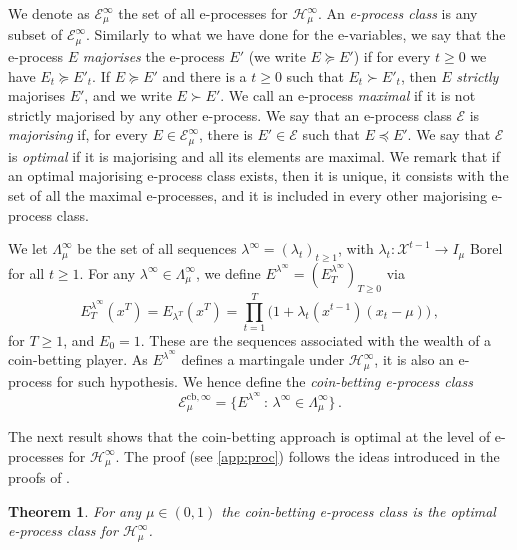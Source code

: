 \documentclass[3p, authoryear, 10pt]{elsarticle}%
\newcommand{\Ecbinf}{\mathcal E^{\mathrm{cb},\infty}}
\newcommand{\Ee}{\mathcal E}
\newcommand{\Hh}{\mathcal H}
\newcommand{\X}{\mathcal X}
\newtheorem{theorem}{Theorem}
\begin{document}
We denote as $\Ee_\mu^{\infty}$ the set of all e-processes for $\Hh_\mu^\infty$. An \emph{e-process class} is any subset of $\Ee_\mu^{\infty}$. Similarly to what we have done for the e-variables, we say that the e-process $E$ \emph{majorises} the e-process $E'$ (we write $E\succeq E'$) if for every $t\geq0$ we have $E_t\succeq E'_t$. If $E\succeq E'$ and there is a $t\geq0$ such that $E_t\succ E'_t$, then $E$ \emph{strictly} majorises $E'$, and we write $E\succ E'$. We call an e-process  \emph{maximal} if it is not strictly majorised by any other e-process. We say that an e-process class $\Ee$ is \emph{majorising} if, for every $E\in\Ee^{\infty}_\mu$, there is $E'\in\Ee$ such that $E\preceq E'$. We say that $\Ee$ is \emph{optimal} if it is majorising and all its elements are maximal. We remark that if an optimal majorising e-process class exists, then it is unique, it consists with the set of all the maximal e-processes, and it is included in every other majorising e-process class.

We let $\Lambda_\mu^\infty$ be the set of all sequences $\lambda^\infty = (\lambda_t)_{t\geq 1}$, with $\lambda_t:\X^{t-1}\to I_\mu$ Borel for all $t\geq 1$. For any $\lambda^\infty\in\Lambda_\mu^\infty$, we define $E^{\lambda^\infty} = (E^{\lambda^\infty}_T)_{T\geq 0}$ via $$E^{\lambda^\infty}_T(x^T) = E_{\lambda^T}(x^T) = \prod_{t=1}^T\big(1+\lambda_t(x^{t-1})(x_t-\mu)\big)\,,$$ for $T\geq 1$, and $E_0=1$. These are the sequences associated with the wealth of a coin-betting player. As $E^{\lambda^\infty}$ defines a martingale under $\Hh_\mu^\infty$, it is also an e-process for such hypothesis. We hence define the \emph{coin-betting e-process class} $$\Ecbinf_\mu = \{E^{\lambda^\infty}\,:\,\lambda^\infty\in\Lambda^\infty_\mu\}\,.$$ 

The next result shows that  the coin-betting approach is optimal at the level of e-processes for $\Hh_\mu^\infty$. The proof (see \ref{app:proc}) follows the ideas introduced in the proofs of .

\begin{theorem}\label{thm:proc}
    For any $\mu\in(0,1)$ the coin-betting e-process class is the optimal e-process class for $\Hh_\mu^\infty$.
\end{theorem}
\end{document}
